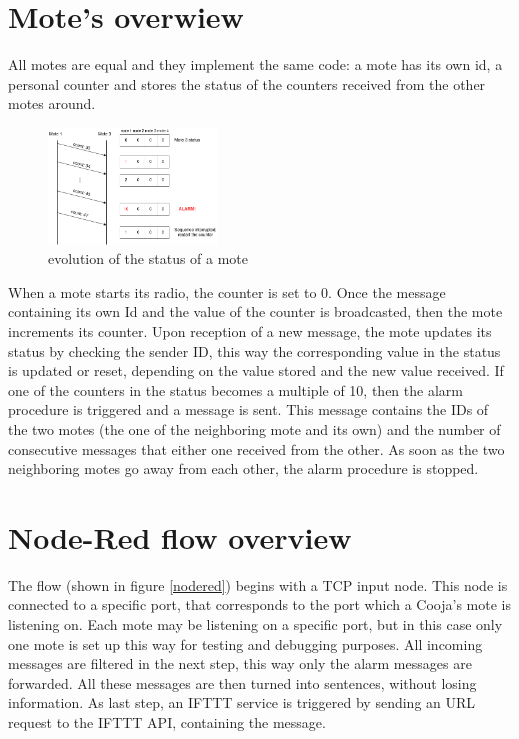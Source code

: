 \documentclass[11pt]{article}
\begin{document}
\section{Mote's overwiew}
All motes are equal and they implement the same code: \newline
a mote has its own id, a personal counter and stores the status of the counters received from the other motes around. \newline
\begin{figure}
  \begin{center}
    \includegraphics[width=0.40\textwidth]{status_update_diagram.png}
    \caption{evolution of the status of a mote}
  \end{center}
\end{figure}
When a mote starts its radio, the counter is set to 0. Once the message containing its own Id and the value of the counter is broadcasted, then the mote increments its counter. \newline
Upon reception of a new message, the mote updates its status by checking the sender ID, this way the corresponding value in the status is updated or reset, depending on the value stored and the new value received. \newline
If one of the counters in the status becomes a multiple of 10, then the alarm procedure is triggered and a message is sent. This message contains the IDs of the two motes (the one of the neighboring mote and its own) and the number of consecutive messages that either one received from the other. \newline
As soon as the two neighboring motes go away from each other, the alarm procedure is stopped.

\section{Node-Red flow overview}
The flow (shown in figure \ref{nodered}) begins with a TCP input node. This node is connected to a specific port, that corresponds to the port which a Cooja's mote is listening on. Each mote may be listening on a specific port, but in this case only one mote is set up this way for testing and debugging purposes. \newline
All incoming messages are filtered in the next step, this way only the alarm messages are forwarded. All these messages are then turned into sentences, without losing information. \newline
As last step, an IFTTT service is triggered by sending an URL request to the IFTTT API, containing the message.
\end{document}
